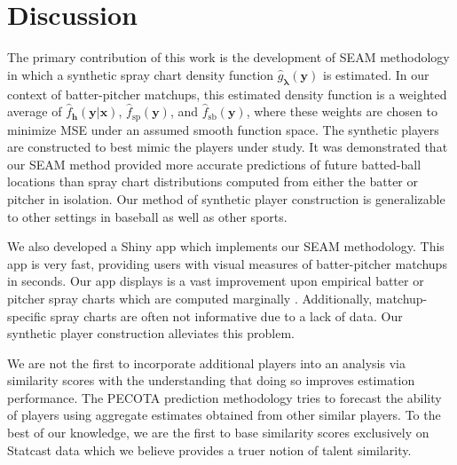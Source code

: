 \documentclass[12pt]{article}
\newcommand{\y}{\textbf{y}}
\newcommand{\x}{\textbf{x}}
\newcommand{\h}{\textbf{h}}
\newcommand{\lambdabf}{\boldsymbol{\lambda}}
\begin{document}
\section{Discussion}

The primary contribution of this work is the development of SEAM methodology in which a synthetic spray chart density function $\hat{g}_{\lambdabf}(\y)$ is estimated. In our context of batter-pitcher matchups, this estimated density function is a weighted average of $\hat f_\h(\y|\x)$, $\hat f_{\text{sp}}(\y)$, and $\hat f_{\text{sb}}(\y)$, where these weights are chosen to minimize MSE under an assumed smooth function space. The synthetic players are constructed to best mimic the players under study. It was demonstrated that our SEAM method provided more accurate predictions of future batted-ball locations than spray chart distributions computed from either the batter or pitcher in isolation. Our method of synthetic player construction is generalizable to other settings in baseball as well as other sports.

We also developed a Shiny app which implements our SEAM methodology. This app is very fast, providing users with visual measures of batter-pitcher matchups in seconds. Our app displays is a vast improvement upon empirical batter or pitcher spray charts which are computed marginally \citep{pettispray, marchi2019analyzing}. Additionally, matchup-specific spray charts are often not informative due to a lack of data. Our synthetic player construction alleviates this problem.

We are not the first to incorporate additional players into an analysis via similarity scores with the understanding that doing so improves estimation performance. The PECOTA prediction methodology \citep{PECOTA} tries to forecast the ability of players using aggregate estimates obtained from other similar players. To the best of our knowledge, we are the first to base similarity scores exclusively on Statcast data which we believe provides a truer notion of talent similarity.





\end{document}
